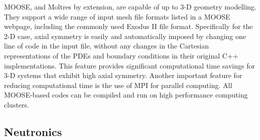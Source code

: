 \gls{MOOSE}, and Moltres by extension, are capable of up to 3-D geometry
modelling. They support a wide range of input mesh file formats listed in a
\gls{MOOSE} webpage, including the commonly used Exodus II file format.
Specifically for the 2-D case, axial symmetry is easily and automatically
imposed by changing one line of code in the input file, without any changes in
the Cartesian representations of the \glspl{PDE} and boundary conditions in
their original C++ implementations. This feature provides significant
computational time savings for 3-D systems that exhibit high axial symmetry.
Another important feature for reducing computational time is the use of MPI
for parallel computing. All \gls{MOOSE}-based codes can be compiled and
run on high performance computing clusters.

\subsection{Neutronics}

